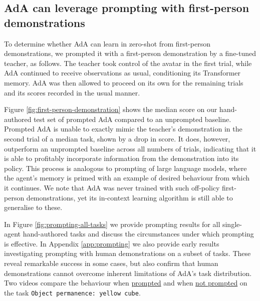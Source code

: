 \subsection{AdA can leverage prompting with first-person demonstrations}

To determine whether AdA can learn in zero-shot from first-person demonstrations, we prompted it with a first-person demonstration by a fine-tuned teacher, as follows. The teacher took control of the avatar in the first trial, while AdA continued to receive observations as usual, conditioning its Transformer memory. AdA was then allowed to proceed on its own for the remaining trials and its scores recorded in the usual manner. 

Figure \ref{fig:first-person-demonstration} shows the median score on our hand-authored test set of prompted AdA compared to an unprompted baseline. Prompted AdA is unable to exactly mimic the teacher's demonstration in the second trial of a median task, shown by a drop in score. It does, however, outperform an unprompted baseline across all numbers of trials, indicating that it is able to profitably incorporate information from the demonstration into its policy. This process is analogous to prompting of large language models, where the agent's memory is primed with an example of desired behaviour from which it continues. We note that AdA was never trained with such off-policy first-person demonstrations, yet its in-context learning algorithm is still able to generalise to these. 

In Figure \ref{fig:prompting-all-tasks} we provide prompting results for all single-agent hand-authored tasks and discuss the circumstances under which prompting is effective. In Appendix \ref{app:prompting} we also provide early results investigating prompting with human demonstrations on a subset of tasks. These reveal remarkable success in some cases, but also confirm that human demonstrations cannot  overcome inherent limitations of AdA's task distribution. Two videos compare the behaviour when \href{https://youtu.be/jdf4jkiJYa4}{prompted} and when \href{https://youtu.be/CuxPknjnYOI}{not prompted} on the task \texttt{Object permanence: yellow cube}.
